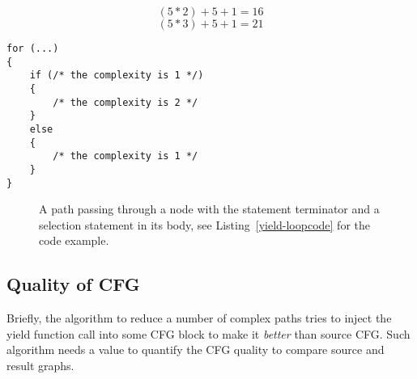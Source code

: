 \begin{equation}
\label{equation-1}
(5 * 2) + 5 + 1 = 16
\end{equation}
\begin{equation}
\label{equation-2}
(5 * 3) + 5 + 1 = 21
\end{equation}

\begin{lstlisting}[caption={A loop statement and a selection statment in a loop body.}, label={yield-loopcode}]
for (...)
{
    if (/* the complexity is 1 */)
    {
        /* the complexity is 2 */
    }
    else
    {
        /* the complexity is 1 */
    }
}
\end{lstlisting}

\begin{figure}[h!]
\centering
\vspace{0.5cm}
\caption{A path passing through a node with the  statement terminator and a selection statement in its body, see Listing~\ref{yield-loopcode} for the code example.}
\label{yield-loop}
\end{figure}

\subsection{Quality of CFG}
\label{yield-quality}
Briefly, the algorithm to reduce a number of complex paths tries to inject the yield function call into some CFG block to make it \textit{better} than source CFG. Such algorithm needs a value to quantify the CFG quality to compare source and result graphs.

